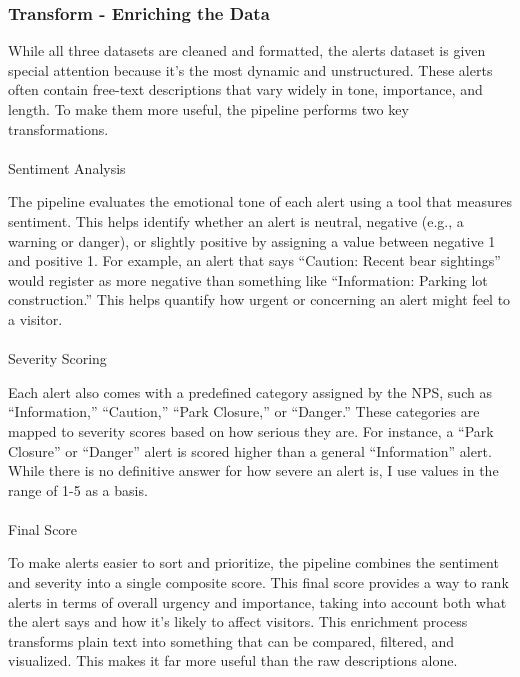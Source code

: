 \documentclass[
  letterpaper,
  DIV=11,
  numbers=noendperiod]{scrartcl}
\makeatletter
\let\oldparagraph\paragraph
\renewcommand{\paragraph}{
    \@ifstar
      \xxxParagraphStar
      \xxxParagraphNoStar
  }
\newcommand{\xxxParagraphStar}[1]{\oldparagraph*{#1}\mbox{}}
\newcommand{\xxxParagraphNoStar}[1]{\oldparagraph{#1}\mbox{}}
\makeatother
\begin{document}
\subsubsection{Transform - Enriching the
Data}\label{transform---enriching-the-data}

While all three datasets are cleaned and formatted, the alerts dataset
is given special attention because it's the most dynamic and
unstructured. These alerts often contain free-text descriptions that
vary widely in tone, importance, and length. To make them more useful,
the pipeline performs two key transformations.

\paragraph{Sentiment Analysis}\label{sentiment-analysis}

The pipeline evaluates the emotional tone of each alert using a tool
that measures sentiment. This helps identify whether an alert is
neutral, negative (e.g., a warning or danger), or slightly positive by
assigning a value between negative 1 and positive 1. For example, an
alert that says ``Caution: Recent bear sightings'' would register as
more negative than something like ``Information: Parking lot
construction.'' This helps quantify how urgent or concerning an alert
might feel to a visitor.

\paragraph{Severity Scoring}\label{severity-scoring}

Each alert also comes with a predefined category assigned by the NPS,
such as ``Information,'' ``Caution,'' ``Park Closure,'' or ``Danger.''
These categories are mapped to severity scores based on how serious they
are. For instance, a ``Park Closure'' or ``Danger'' alert is scored
higher than a general ``Information'' alert. While there is no
definitive answer for how severe an alert is, I use values in the range
of 1-5 as a basis.

\paragraph{Final Score}\label{final-score}

To make alerts easier to sort and prioritize, the pipeline combines the
sentiment and severity into a single composite score. This final score
provides a way to rank alerts in terms of overall urgency and
importance, taking into account both what the alert says and how it's
likely to affect visitors. This enrichment process transforms plain text
into something that can be compared, filtered, and visualized. This
makes it far more useful than the raw descriptions alone.
\end{document}
